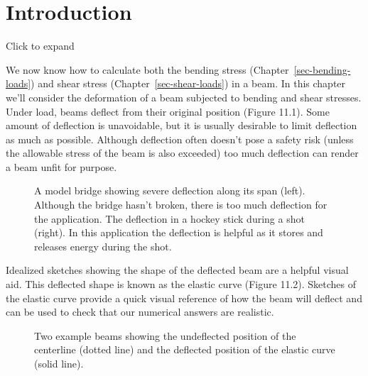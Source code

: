 \documentclass[
  letterpaper,
  DIV=11,
  numbers=noendperiod]{scrreprt}
\begin{document}
\section*{Introduction}\label{introduction-11}


Click to expand

We now know how to calculate both the bending stress
(Chapter~\ref{sec-bending-loads}) and shear stress
(Chapter~\ref{sec-shear-loads}) in a beam. In this chapter we'll
consider the deformation of a beam subjected to bending and shear
stresses. Under load, beams deflect from their original position (Figure
11.1). Some amount of deflection is unavoidable, but it is usually
desirable to limit deflection as much as possible. Although deflection
often doesn't pose a safety risk (unless the allowable stress of the
beam is also exceeded) too much deflection can render a beam unfit for
purpose.

\begin{figure}


\caption{\label{fig-11.1}A model bridge showing severe deflection along
its span (left). Although the bridge hasn't broken, there is too much
deflection for the application. The deflection in a hockey stick during
a shot (right). In this application the deflection is helpful as it
stores and releases energy during the shot.}

\end{figure}%

Idealized sketches showing the shape of the deflected beam are a helpful
visual aid. This deflected shape is known as the elastic curve (Figure
11.2). Sketches of the elastic curve provide a quick visual reference of
how the beam will deflect and can be used to check that our numerical
answers are realistic.

\begin{figure}


\caption{\label{fig-11.2}Two example beams showing the undeflected
position of the centerline (dotted line) and the deflected position of
the elastic curve (solid line).}

\end{figure}%
\end{document}
